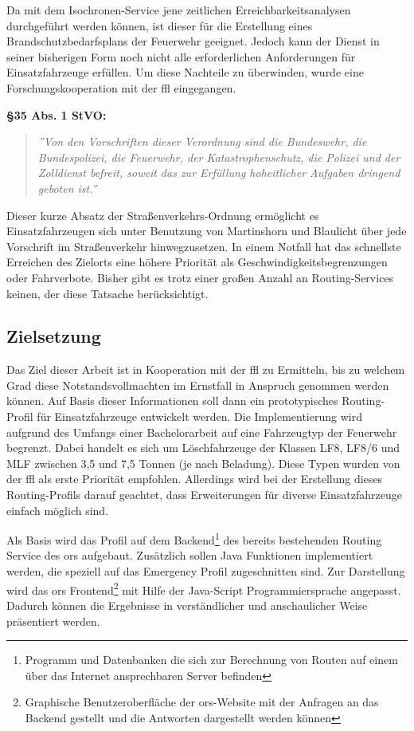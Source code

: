 \documentclass[12pt,a4paper]{article}
\begin{document}
Da mit dem Isochronen-Service jene zeitlichen Erreichbarkeitsanalysen durchgeführt werden können, ist dieser für die Erstellung eines Brandschutzbedarfsplans der Feuerwehr geeignet. Jedoch kann der Dienst in seiner bisherigen Form noch nicht alle erforderlichen Anforderungen für Einsatzfahrzeuge erfüllen. Um diese Nachteile zu überwinden, wurde eine Forschungskooperation mit der \gls{ffl} eingegangen.
\vspace{1.2cm}

\textbf{§35 Abs. 1 StVO:}
\begin{quotation}
\label{cit:STVO}
{\itshape\rmfamily ''Von den Vorschriften dieser Verordnung sind die Bundeswehr, die Bundespolizei, die Feuerwehr, der Katastrophenschutz, die Polizei und der Zolldienst befreit, soweit das zur Erfüllung hoheitlicher Aufgaben dringend geboten ist.''}
\end{quotation}

\vspace{1.2cm}

Dieser kurze Absatz der Straßenverkehrs-Ordnung ermöglicht es Einsatzfahrzeugen sich unter Benutzung von Martinshorn und Blaulicht über jede Vorschrift im Straßenverkehr hinwegzusetzen. In einem Notfall hat das schnellste Erreichen des Zielorts eine höhere Priorität als Geschwindigkeitsbegrenzungen oder Fahrverbote. Bisher gibt es trotz einer großen Anzahl an Routing-Services keinen, der diese Tatsache berücksichtigt. 


\subsection{Zielsetzung}
Das Ziel dieser Arbeit ist in Kooperation mit der \gls{ffl} zu Ermitteln, bis zu welchem Grad diese Notstandsvollmachten im Ernstfall in Anspruch genommen werden können. Auf Basis dieser Informationen soll dann ein prototypisches Routing-Profil für Einsatzfahrzeuge entwickelt werden. Die Implementierung wird aufgrund des Umfangs einer Bachelorarbeit auf eine Fahrzeugtyp der Feuerwehr begrenzt. Dabei handelt es sich um Löschfahrzeuge der Klassen LF8, LF8/6 und MLF zwischen 3,5 und 7,5 Tonnen (je nach Beladung). Diese Typen wurden von der \gls{ffl} als erste Priorität empfohlen. Allerdings wird bei der Erstellung dieses Routing-Profils darauf geachtet, dass Erweiterungen für diverse Einsatzfahrzeuge einfach möglich sind.
\vspace{0.5cm}

Als Basis wird das Profil auf dem Backend\footnote{Programm und Datenbanken die sich zur Berechnung von Routen auf einem über das Internet ansprechbaren Server befinden} des bereits bestehenden Routing Service des \gls{ors} aufgebaut. Zusätzlich sollen Java Funktionen implementiert werden, die speziell auf das Emergency Profil zugeschnitten sind. Zur Darstellung wird das \gls{ors} Frontend\footnote{Graphische Benutzeroberfläche der \gls{ors}-Website mit der Anfragen an das Backend gestellt und die Antworten dargestellt werden können} mit Hilfe der Java-Script Programmiersprache angepasst. Dadurch können die Ergebnisse in verständlicher und anschaulicher Weise präsentiert werden.
\end{document}
